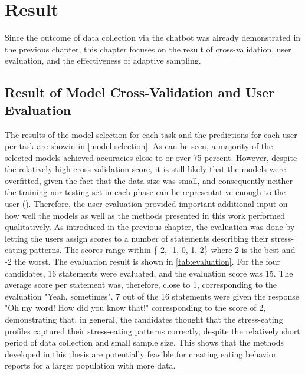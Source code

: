 
\chapter{Result}\label{chapter:result}
Since the outcome of data collection via the chatbot was already demonstrated in the previous chapter, this chapter focuses on the result of cross-validation, user evaluation, and the effectiveness of adaptive sampling.

\section{Result of Model Cross-Validation and User Evaluation}

The results of the model selection for each task and the predictions for each user per task are showin in \autoref{model-selection}. As can be seen, a majority of the selected models achieved accuracies close to or over 75 percent. However, despite the relatively high cross-validation score, it is still likely that the models were overfitted, given the fact that the data size was small, and consequently neither the training nor testing set in each phase can be representative enough to the user (\cite{45_overfitting}). Therefore, the user evaluation provided important additional input on how well the models as well as the methods presented in this work performed qualitatively. As introduced in the previous chapter, the evaluation was done by letting the users assign scores to a number of statements describing their stress-eating patterns. The scores range within \{-2, -1, 0, 1, 2\} where 2 is the best and -2 the worst. The evaluation result is shown in \autoref{tab:evaluation}. For the four candidates, 16 statements were evaluated, and the evaluation score was 15. The average score per statement was, therefore, close to 1, corresponding to the evaluation "Yeah, sometimes". 7 out of the 16 statements were given the response "Oh my word! How did you know that!" corresponding to the score of 2, demonstrating that, in general, the candidates thought that the stress-eating profiles captured their stress-eating patterns correctly, despite the relatively short period of data collection and small sample size. This shows that the methods developed in this thesis are potentially feasible for creating eating behavior reports for a larger population with more data.\bigskip

